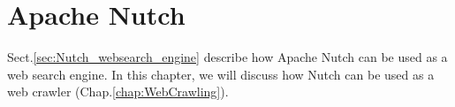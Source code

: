 \chapter{Apache Nutch}
\label{chap:Apache_Nutch}
\label{chap:Nutch}

Sect.\ref{sec:Nutch_websearch_engine} describe how Apache Nutch can be used as a web search engine.
In this chapter, we will discuss how Nutch can be used as a web crawler (Chap.\ref{chap:WebCrawling}).

